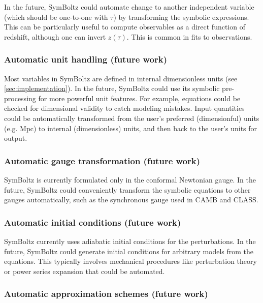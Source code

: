 \documentclass{aa}
\begin{document}
In the future, SymBoltz could automate change to another independent variable (which should be one-to-one with $\tau$) by transforming the symbolic expressions.
This can be particularly useful to compute observables as a direct function of redshift, although one can invert $z(\tau)$.
This is common in fits to observations.

\subsubsection{Automatic unit handling (future work)}
\label{sec:units}

Most variables in SymBoltz are defined in internal dimensionless units (see \cref{sec:implementation}).
In the future, SymBoltz could use its symbolic pre-processing for more powerful unit features.
For example, equations could be checked for dimensional validity to catch modeling mistakes.
Input quantities could be automatically transformed from the user's preferred (dimensionful) units (e.g. $\text{Mpc}$) to internal (dimensionless) units, and then back to the user's units for output.

\subsubsection{Automatic gauge transformation (future work)}
\label{sec:gauges}

SymBoltz is currently formulated only in the conformal Newtonian gauge.
In the future, SymBoltz could conveniently transform the symbolic equations to other gauges automatically, such as the synchronous gauge used in CAMB and CLASS.

\subsubsection{Automatic initial conditions (future work)}
\label{sec:ics}

SymBoltz currently uses adiabatic initial conditions for the perturbations.
In the future, SymBoltz could generate initial conditions for arbitrary models from the equations.
This typically involves mechanical procedures like perturbation theory or power series expansion that could be automated.

\subsubsection{Automatic approximation schemes (future work)}
\label{sec:approximations}
\end{document}
